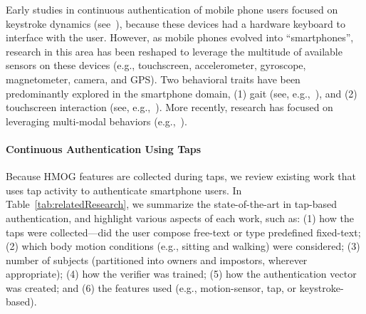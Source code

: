 %
Early studies in continuous authentication of mobile phone users focused on keystroke dynamics (see~\cite{clarke2007,clarke2007109,buchoux2008,maiorana2011,campisi2009}),  because these devices had a hardware keyboard to interface with the user. However, as mobile phones evolved into ``smartphones'',  research in this area has been reshaped to leverage the multitude of available sensors  on these devices (e.g., touchscreen, accelerometer, gyroscope, magnetometer, camera, and GPS). Two behavioral traits have been predominantly explored in the smartphone domain, (1) gait (see, e.g.,~\cite{frank2013,serwadda2013}), and (2) touchscreen interaction (see, e.g.,~\cite{derawi2010,vildjiounaite2006}). More recently, research has focused on  leveraging multi-modal behaviors (e.g.,~\cite{bo2013,Weidong2011}).
%

%
%
%
%

\paragraph{Continuous Authentication Using Taps}
%
%
%
Because HMOG features are collected during taps, we review existing work that uses tap activity to authenticate smartphone users. %
In Table~\ref{tab:relatedResearch}, we summarize the state-of-the-art in tap-based authentication, and highlight various aspects of each work, such as: (1) how the taps were collected---did the user compose free-text or type predefined fixed-text; (2) which body motion conditions (e.g., sitting and walking) were considered; (3) number of subjects (partitioned into owners and impostors, wherever appropriate); (4) how the verifier was trained; (5) how the authentication vector was created; and (6) the features used (e.g., motion-sensor, tap, or keystroke-based). %




